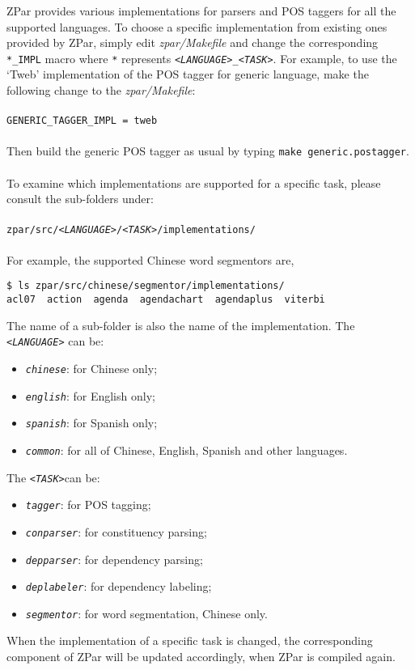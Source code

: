 \documentclass[12pt]{article}
\begin{document}
\begin{CJK}{GBK}{song}
ZPar provides various implementations for parsers and POS taggers for all the supported languages.
To choose a specific implementation
from existing ones provided by ZPar,
simply edit \textit{zpar/Makefile}
and change the corresponding \texttt{*\_IMPL} macro
where \texttt{*} represents \texttt{\textit{<LANGUAGE>\_<TASK>}}.
For example, to use the `Tweb' implementation 
of the POS tagger for generic language,
make the following change to the \textit{zpar/Makefile}:
\\
\\
\hspace{3cm}\texttt{GENERIC\_TAGGER\_IMPL = tweb}
\\
\\
Then build the generic POS tagger as usual by typing \texttt{make generic.postagger}.
\\
\\
To examine which implementations are supported for a specific task,
please consult the sub-folders under:
\\
\\
\texttt{zpar/src/\textit{<LANGUAGE>}/\textit{<TASK>}/implementations/}
\\
\\
For example, the supported Chinese word segmentors are,
\begin{verbatim}
$ ls zpar/src/chinese/segmentor/implementations/
acl07  action  agenda  agendachart  agendaplus  viterbi
\end{verbatim}
The name of a sub-folder is also the name of the implementation.
The \texttt{\textit{<LANGUAGE>}} can be:
\begin{itemize}
\item \texttt{\textit{chinese}}: for Chinese only;
\item \texttt{\textit{english}}: for English only;
\item \texttt{\textit{spanish}}: for Spanish only;
\item \texttt{\textit{common}}: for all of Chinese, English, Spanish and other languages.
\end{itemize}
The \texttt{\textit{<TASK>}}can be:
\begin{itemize}
\item \texttt{\textit{tagger}}: for POS tagging;
\item \texttt{\textit{conparser}}: for constituency parsing;
\item \texttt{\textit{depparser}}: for dependency parsing;
\item \texttt{\textit{deplabeler}}: for dependency labeling;
\item \texttt{\textit{segmentor}}: for word segmentation, Chinese only.
\end{itemize}
When the implementation of a specific task is changed,
the corresponding component of ZPar will be updated accordingly,
when ZPar is compiled again.


\end{CJK}
\end{document}
